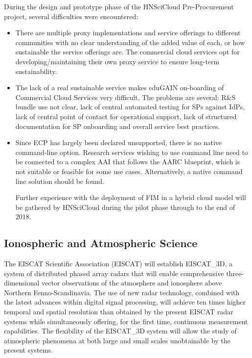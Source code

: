 \documentclass[fleqn,10pt]{wlscirep}
\begin{document}
{During the design and prototype phase of the HNSciCloud Pre-Procurement project, several difficulties were encountered:
\begin{itemize}
\item There are multiple proxy implementations and service offerings to different communities with no clear understanding of the added value of each, or how sustainable the service offerings are. The commercial cloud services opt for developing/maintaining their own proxy service to ensure long-term sustainability.  
\item The lack of a real sustainable service makes eduGAIN on-boarding of Commercial Cloud Services very difficult. The problems are several: R\&S bundle use not clear, lack of central automated testing for SPs against IdPs, lack of central point of contact for operational support, lack of structured documentation for SP onboarding and overall service best practices.
\item Since ECP has largely been declared unsupported, there is no native command-line option. Research services wishing to use command line need to be connected to a complex AAI that follows the AARC blueprint, which is not suitable or feasible for some use cases. Alternatively, a native command line solution should be found.

Further experience with the deployment of FIM in a hybrid cloud model will be gathered by HNSciCloud during the pilot phase through to the end of 2018. 

\end{itemize}

\subsection{Ionospheric and Atmospheric Science}
The EISCAT Scientific Association (EISCAT) will establish EISCAT\_3D, a system of distributed phased array radars that will enable comprehensive three-dimensional vector observations of the atmosphere and ionosphere above Northern Fenno-Scandinavia. The use of new radar technology, combined with the latest advances within digital signal processing, will achieve ten times higher temporal and spatial resolution than obtained by the present EISCAT radar systems while simultaneously offering, for the first time, continuous measurement capabilities. The flexibility of the EISCAT\_3D system will allow the study of atmospheric phenomena at both large and small scales unobtainable by the present systems.

}
\end{document}
